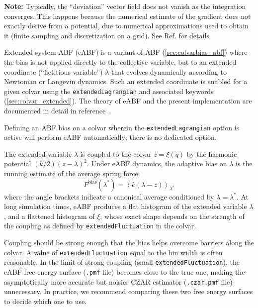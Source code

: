 \textbf{Note:} Typically, the ``deviation'' vector field does not
vanish as the integration converges. This happens because the
numerical estimate of the gradient does not exactly derive from a
potential, due to numerical approximations used to obtain it (finite
sampling and discretization on a grid). See Ref.\cite{Henin2021} for details.



\label{sec:eABF}

Extended-system ABF (eABF) is a variant of ABF (\ref{sec:colvarbias_abf})
where the bias is not applied
directly to the collective variable, but to an extended coordinate  (``fictitious variable'')
$\lambda$ that evolves dynamically according to Newtonian or Langevin dynamics.
Such an extended coordinate is enabled for a given colvar using the
\texttt{extendedLagrangian} and associated keywords (\ref{sec:colvar_extended}).
The theory of eABF and the present implementation are documented in detail
in reference~\cite{Lesage2017}.

Defining an ABF bias on a colvar wherein the \texttt{extendedLagrangian} option
is active will perform eABF automatically; there is no dedicated option.

The extended variable $\lambda$ is coupled to the colvar $z=\xi(q)$ by the harmonic potential
$(k/2) (z - \lambda)^2$.
Under eABF dynamics, the adaptive bias on $\lambda$ is
the running estimate of the average spring force:
\begin{equation}
F^{\mathrm{bias}}(\lambda^{*}) = \left\langle k(\lambda{} - z) \right\rangle_{\lambda^{*}}
\end{equation}
where the angle brackets indicate a canonical average conditioned by $\lambda=\lambda^*$.
At long simulation times, eABF produces a flat histogram of the extended variable $\lambda$,
and a flattened histogram of $\xi$, whose exact shape depends on the strength of the coupling
as defined by \texttt{extendedFluctuation} in the colvar.

Coupling should be strong enough that the bias helps overcome barriers along the colvar.\cite{Lesage2017}
A value of \texttt{extendedFluctuation} equal to the bin width is often reasonable.
In the limit of strong coupling (small \texttt{extendedFluctuation}), the eABF free energy surface
(\texttt{.pmf} file) becomes close to the true one, making the asymptotically more accurate but
noisier CZAR estimator (\texttt{.czar.pmf} file) unnecessary.
In practice, we recommend comparing these two free energy surfaces to decide which one to use.

